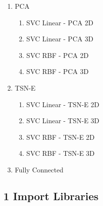 \documentclass[11pt]{article}
\providecommand{\tightlist}{%
      \setlength{\itemsep}{0pt}\setlength{\parskip}{0pt}}
\begin{document}
\begin{enumerate}
  \begin{enumerate}
  \def\labelenumii{\arabic{enumii}.}
  \tightlist
  \item
    PCA

    \begin{enumerate}
    \def\labelenumiii{\arabic{enumiii}.}
    \tightlist
    \item
      SVC Linear - PCA 2D
    \item
      SVC Linear - PCA 3D
    \item
      SVC RBF - PCA 2D
    \item
      SVC RBF - PCA 3D
    \end{enumerate}
  \item
    TSN-E

    \begin{enumerate}
    \def\labelenumiii{\arabic{enumiii}.}
    \tightlist
    \item
      SVC Linear - TSN-E 2D
    \item
      SVC Linear - TSN-E 3D
    \item
      SVC RBF - TSN-E 2D
    \item
      SVC RBF - TSN-E 3D
    \end{enumerate}
  \item
    Fully Connected
  \end{enumerate}
\end{enumerate}

    \hypertarget{import-libraries}{%
\subsection{1 Import Libraries}\label{import-libraries}}
\end{document}
